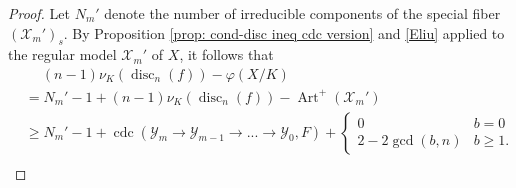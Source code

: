 \documentclass[12pt]{amsart}
\numberwithin{equation}{section}
\theoremstyle{definition}
\renewcommand{\phi}{\varphi}
\newcommand{\X}{\mathcal{X}}
\newcommand{\Y}{\mathcal{Y}}
\DeclareMathOperator{\disc}{disc}
\DeclareMathOperator{\Art}{Art}
\DeclareMathOperator{\cdc}{cdc}
\begin{document}
\begin{proof}
    Let $N_m'$ denote the number of irreducible components of the
    special fiber $(\X_m')_s$. By Proposition \ref{prop: cond-disc
      ineq cdc version} and \eqref{Eliu} applied
    to the regular model $\X_m'$ of $X$, it follows that 
    \begin{equation}\label{Ecdcexpression}
    \begin{aligned}
    &\quad\  (n-1)\nu_K(\disc_n(f))-\phi(X/K) \\
        &= N_m'-1+ (n-1)\nu_K(\disc_n(f))-\Art^+(\mathcal{X}_m')\\
        &\geq N_m'-1+\cdc(\Y_m\to\Y_{m-1}\to...\to\Y_0, F)+\begin{cases}
            0&b=0\\
            2-2\gcd(b,n)&b\geq1.
        \end{cases}\\
    \end{aligned}
    \end{equation}
    

\end{proof}
\end{document}
